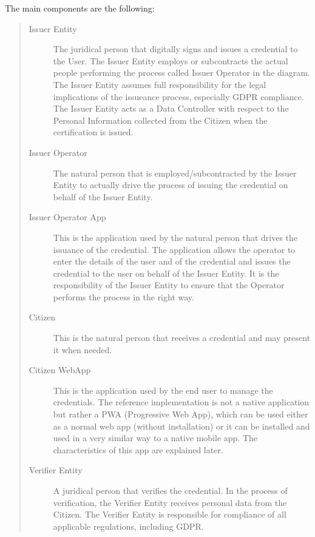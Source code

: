 \documentclass[a4paper,12pt,english,openany]{sphinxmanual}
\begin{document}
\sphinxAtStartPar
The main components are the following:
\begin{quote}\begin{description}
\item[{Issuer Entity}] \leavevmode
\sphinxAtStartPar
The juridical person that digitally signs and issues a credential to the User. The Issuer Entity employs or subcontracts the actual people performing the process called Issuer Operator in the diagram. The Issuer Entity assumes full responsibility for the legal implications of the issueance process, especially GDPR compliance. The Issuer Entity acts as a Data Controller with respect to the Personal Information collected from the Citizen when the certification is issued.

\item[{Issuer Operator}] \leavevmode
\sphinxAtStartPar
The natural person that is employed/subcontracted by the Issuer Entity to actually drive the process of issuing the credential on behalf of the Issuer Entity.

\item[{Issuer Operator App}] \leavevmode
\sphinxAtStartPar
This is the application used by the natural person that drives the issuance of the credential. The application allows the operator to enter the details of the user and of the credential and issues the credential to the user on behalf of the Issuer Entity. It is the responsibility of the Issuer Entity to ensure that the Operator performs the process in the right way.

\item[{Citizen}] \leavevmode
\sphinxAtStartPar
This is the natural person that receives a credential and may present it when needed.

\item[{Citizen  WebApp}] \leavevmode
\sphinxAtStartPar
This is the application used by the end user to manage the credentials. The reference implementation is not a native application but rather a PWA (Progressive Web App), which can be used either as a normal web app (without installation) or it can be installed and used in a very similar way to a native mobile app. The characteristics of this app are explained later.

\item[{Verifier Entity}] \leavevmode
\sphinxAtStartPar
A juridical person that verifies the credential. In the process of verification, the Verifier Entity receives personal data from the Citizen. The Verifier Entity is responsible for compliance of all applicable regulations, including GDPR.


\end{description}
\end{quote}
\end{document}
